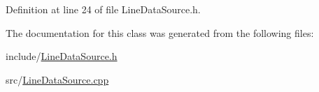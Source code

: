 Definition at line 24 of file Line\+Data\+Source.\+h.



The documentation for this class was generated from the following files\+:\begin{DoxyCompactItemize}
\item 
include/\hyperlink{LineDataSource_8h}{Line\+Data\+Source.\+h}\item 
src/\hyperlink{LineDataSource_8cpp}{Line\+Data\+Source.\+cpp}\end{DoxyCompactItemize}

